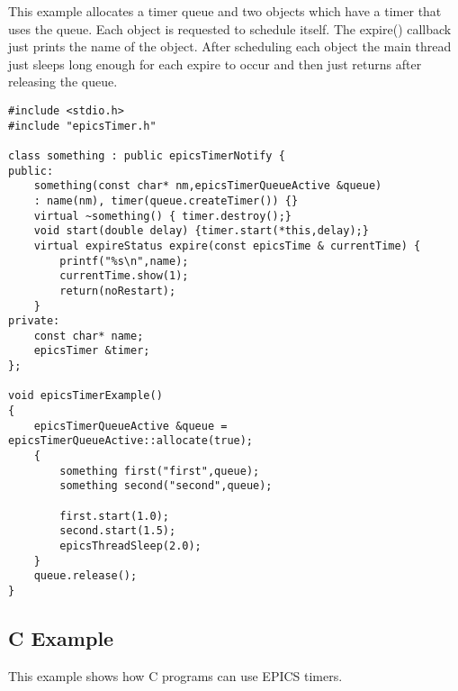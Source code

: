 This example allocates a timer queue and two objects which have a timer that uses the queue. Each object is requested to 
schedule itself. The expire() callback just prints the name of the object. After scheduling each object the main thread just 
sleeps long enough for each expire to occur and then just returns after releasing the queue.

\begin{verbatim}#include <stdio.h>
#include "epicsTimer.h"

class something : public epicsTimerNotify {
public:
    something(const char* nm,epicsTimerQueueActive &queue)
    : name(nm), timer(queue.createTimer()) {}
    virtual ~something() { timer.destroy();}
    void start(double delay) {timer.start(*this,delay);}
    virtual expireStatus expire(const epicsTime & currentTime) {
        printf("%s\n",name);
        currentTime.show(1);
        return(noRestart);
    }
private:
    const char* name;
    epicsTimer &timer;
};

void epicsTimerExample()
{
    epicsTimerQueueActive &queue = epicsTimerQueueActive::allocate(true);
    {
        something first("first",queue);
        something second("second",queue);

        first.start(1.0);
        second.start(1.5);
        epicsThreadSleep(2.0);
    }
    queue.release();
}
\end{verbatim}\subsection{C Example}

This example shows how C programs can use EPICS timers.

